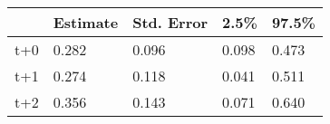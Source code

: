 \begin{tabular}{lllll}
  \toprule
  & Estimate & Std. Error & 2.5\% & 97.5\% \\ 
  \midrule
t+0 & 0.282 & 0.096 & 0.098 & 0.473 \\ 
  t+1 & 0.274 & 0.118 & 0.041 & 0.511 \\ 
  t+2 & 0.356 & 0.143 & 0.071 & 0.640 \\ 
   \bottomrule
\end{tabular}
